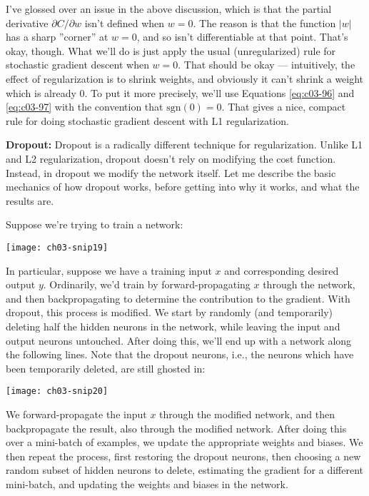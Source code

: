 I've glossed over an issue in the above discussion, which is that the partial derivative $\partial C / \partial w$ isn't defined when $w=0$. The reason is that the function $|w|$ has a sharp ''corner'' at $w=0$, and so isn't differentiable at that point. That's okay, though. What we'll do is just apply the usual (unregularized) rule for stochastic gradient descent when $w=0$. That should be okay --- intuitively, the effect of regularization is to shrink weights, and obviously it can't shrink a weight which is already 0. To put it more precisely, we'll use Equations \ref{eq:c03-96} and \ref{eq:c03-97} with the convention that $\textrm{sgn}(0)=0$. That gives a nice, compact rule for doing stochastic gradient descent with L1 regularization.

\textbf{Dropout:} \label{page:dropout} Dropout is a radically different technique for regularization. Unlike L1 and L2 regularization, dropout doesn't rely on modifying the cost function. Instead, in dropout we modify the network itself. Let me describe the basic mechanics of how dropout works, before getting into why it works, and what the results are.

Suppose we're trying to train a network:
\begin{marginfigure}
\texttt{[image: ch03-snip19]}
\end{marginfigure}
    
In particular, suppose we have a training input $x$ and corresponding desired output $y$. Ordinarily, we'd train by forward-propagating $x$ through the network, and then backpropagating to determine the contribution to the gradient. With dropout, this process is modified. We start by randomly (and temporarily) deleting half the hidden neurons in the network, while leaving the input and output neurons untouched. After doing this, we'll end up with a network along the following lines. Note that the dropout neurons, i.e., the neurons which have been temporarily deleted, are still ghosted in:
\begin{marginfigure}
    \texttt{[image: ch03-snip20]}
    \end{marginfigure}
    

We forward-propagate the input $x$ through the modified network, and then backpropagate the result, also through the modified network. After doing this over a mini-batch of examples, we update the appropriate weights and biases. We then repeat the process, first restoring the dropout neurons, then choosing a new random subset of hidden neurons to delete, estimating the gradient for a different mini-batch, and updating the weights and biases in the network.


